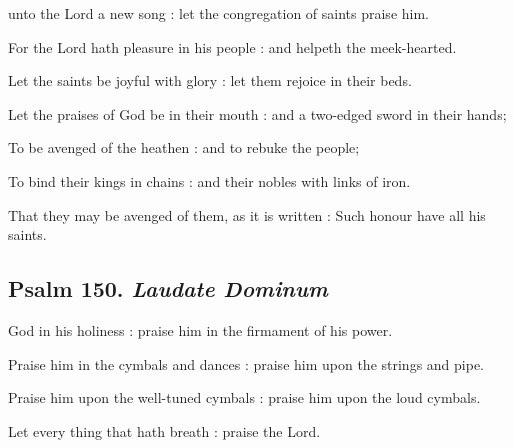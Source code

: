  unto the Lord a new song : let the congregation of saints praise him.\par
{}
For the Lord hath pleasure in his people : and helpeth the meek-hearted.\par
{}Let the saints be joyful with glory : let them rejoice in their beds.\par
{}Let the praises of God be in their mouth : and a two-edged sword in their hands;\par
{}To be avenged of the heathen : and to rebuke the people;\par
{}To bind their kings in chains : and their nobles with links of iron.\par
{}That they may be avenged of them, as it is written : Such honour have all his saints.\par

\subsection{Psalm 150. \textit{Laudate Dominum}}

 God in his holiness : praise him in the firmament of his power.\par
{}
Praise him in the cymbals and dances : praise him upon the strings and pipe.\par
{}Praise him upon the well-tuned cymbals : praise him upon the loud cymbals.\par
{}Let every thing that hath breath : praise the Lord.